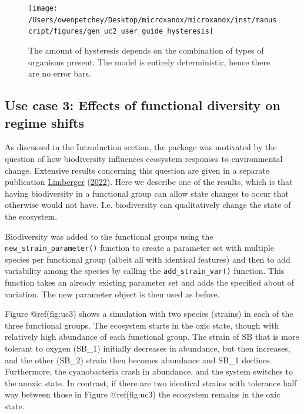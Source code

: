 \documentclass[]{elsarticle} %
\begin{document}
\begin{figure}

{\centering \texttt{[image: /Users/owenpetchey/Desktop/microxanox/microxanox/inst/manuscript/figures/gen\_uc2\_user\_guide\_hysteresis]} 

}

\caption{The amount of hysteresis depends on the combination of types of organisms present. The model is entirely deterministic, hence there are no error bars.}\label{fig:uc2}
\end{figure}

\hypertarget{use-case-3-effects-of-functional-diversity-on-regime-shifts}{%
\subsection{Use case 3: Effects of functional diversity on regime
shifts}\label{use-case-3-effects-of-functional-diversity-on-regime-shifts}}

As discussed in the Introduction section, the package was motivated by
the question of how biodiversity influences ecosystem responses to
environmental change. Extensive results concerning this question are
given in a separate publication
\protect\hyperlink{ref-Limberger2022}{Limberger}
(\protect\hyperlink{ref-Limberger2022}{2022}). Here we describe one of
the results, which is that having biodiversity in a functional group can
allow state changes to occur that otherwise would not have. I.e.
biodiversity can qualitatively change the state of the ecosystem.

Biodiversity was added to the functional groups using the
\texttt{new\_strain\_parameter()} function to create a parameter set
with multiple species per functional group (albeit all with identical
features) and then to add variability among the species by calling the
\texttt{add\_strain\_var()} function. This function takes an already
existing parameter set and adds the specified about of variation. The
new parameter object is then used as before.

Figure @ref(fig:uc3) shows a simulation with two species (strains) in
each of the three functional groups. The ecosystem starts in the oxic
state, though with relatively high abundance of each functional group.
The strain of SB that is more tolerant to oxygen (SB\_1) initially
decreases in abundance, but then increases, and the other (SB\_2) strain
then becomes abundance and SB\_1 declines. Furthermore, the
cyanobacteria crash in abundance, and the system switches to the anoxic
state. In contrast, if there are two identical strains with tolerance
half way between those in Figure @ref(fig:uc3) the ecosystem remains in
the oxic state.
\end{document}
